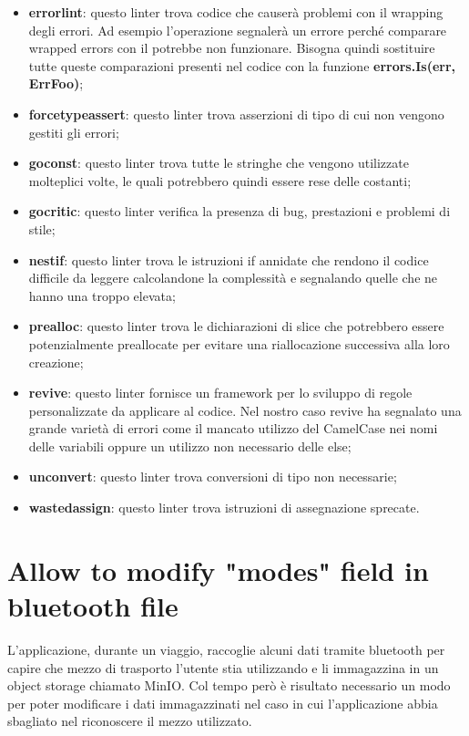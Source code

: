 \documentclass[main.tex]{subfiles}
\begin{document}
\begin{itemize}
    \item \textbf{errorlint}: questo linter trova codice che causerà problemi con il wrapping degli errori. Ad esempio l'operazione  segnalerà un errore perché comparare wrapped errors con il \say{==} potrebbe non funzionare. Bisogna quindi sostituire tutte queste comparazioni presenti nel codice con la funzione \textbf{errors.Is(err, ErrFoo)};
    \item \textbf{forcetypeassert}: questo linter trova asserzioni di tipo di cui non vengono gestiti gli errori;
    \item \textbf{goconst}: questo linter trova tutte le stringhe che vengono utilizzate molteplici volte, le quali potrebbero quindi essere rese delle costanti;
    \item \textbf{gocritic}: questo linter verifica la presenza di bug, prestazioni e problemi di stile;
    \item \textbf{nestif}: questo linter trova le istruzioni if annidate che rendono il codice difficile da leggere calcolandone la complessità e segnalando quelle che ne hanno una troppo elevata;
    \item \textbf{prealloc}: questo linter trova le dichiarazioni di slice che potrebbero essere potenzialmente preallocate per evitare una riallocazione successiva alla loro creazione;
    \item \textbf{revive}: questo linter fornisce un framework per lo sviluppo di regole personalizzate da applicare al codice. Nel nostro caso revive ha segnalato una grande varietà di errori come il mancato utilizzo del CamelCase nei nomi delle variabili oppure un utilizzo non necessario delle else;
    \item \textbf{unconvert}: questo linter trova conversioni di tipo non necessarie;
    \item \textbf{wastedassign}: questo linter trova istruzioni di assegnazione sprecate.
\end{itemize}


\section{Allow to modify "modes" field in bluetooth file}
L'applicazione, durante un viaggio, raccoglie alcuni dati tramite bluetooth per capire che mezzo di trasporto l'utente stia utilizzando e li immagazzina in un object storage chiamato MinIO. \newline
Col tempo però è risultato necessario un modo per poter modificare i dati immagazzinati nel caso in cui l'applicazione abbia sbagliato nel riconoscere il mezzo utilizzato. \newline
\end{document}
